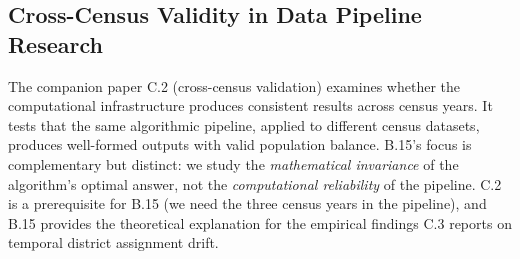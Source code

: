\subsection{Cross-Census Validity in Data Pipeline Research}

The companion paper C.2 (cross-census validation) examines whether the
computational infrastructure produces consistent results across census years.
It tests that the same algorithmic pipeline, applied to different census
datasets, produces well-formed outputs with valid population balance.
B.15's focus is complementary but distinct: we study the \emph{mathematical
invariance} of the algorithm's optimal answer, not the \emph{computational
reliability} of the pipeline.
C.2 is a prerequisite for B.15 (we need the three census years in the
pipeline), and B.15 provides the theoretical explanation for the empirical
findings C.3 reports on temporal district assignment drift.
